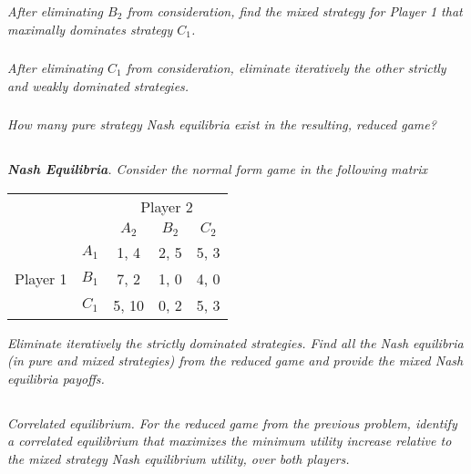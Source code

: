 \documentclass[12pt]{amsart}
\begin{document}
	\subsubsection{}
	\textit{After eliminating $B_2$ from consideration, find the mixed strategy for Player 1 that
	maximally dominates strategy $C_1$.}

	\subsubsection{}
	\textit{After eliminating $C_1$ from consideration, eliminate iteratively the other strictly and
	weakly dominated strategies.}
 
	\subsubsection{}
	\textit{How many pure strategy Nash equilibria exist in the resulting, reduced game?}




\subsection{}
\textit{\textbf{Nash Equilibria}. Consider the normal form game in the following matrix}

\begin{center}
	\def\arraystretch{1.25}%
	\begin{tabular}{ccccc}
		&                            & \multicolumn{3}{c}{Player 2}                                                         \\
		& \multicolumn{1}{c|}{}      & \multicolumn{1}{c|}{$A_2$} & \multicolumn{1}{c|}{$B_2$} & \multicolumn{1}{c|}{$C_2$} \\ \cline{2-5} 
		& \multicolumn{1}{c|}{$A_1$} & \multicolumn{1}{c|}{1, 4}  & \multicolumn{1}{c|}{2, 5}  & \multicolumn{1}{c|}{5, 3}  \\ \cline{2-5} 
		Player 1 & \multicolumn{1}{c|}{$B_1$} & \multicolumn{1}{c|}{7, 2}  & \multicolumn{1}{c|}{1, 0}  & \multicolumn{1}{c|}{4, 0}  \\ \cline{2-5} 
		& \multicolumn{1}{c|}{$C_1$} & \multicolumn{1}{c|}{5, 10} & \multicolumn{1}{c|}{0, 2}  & \multicolumn{1}{c|}{5, 3}  \\ \cline{2-5} 
	\end{tabular}
\end{center}

\textit{Eliminate iteratively the strictly dominated strategies. Find all the Nash equilibria (in pure
	and mixed strategies) from the reduced game and provide the mixed Nash equilibria
	payoffs.}



\subsection{}
\textit{Correlated equilibrium. For the reduced game from the previous problem, identify a
	correlated equilibrium that maximizes the minimum utility increase relative to the mixed strategy Nash equilibrium utility, over both players.}
\end{document}
